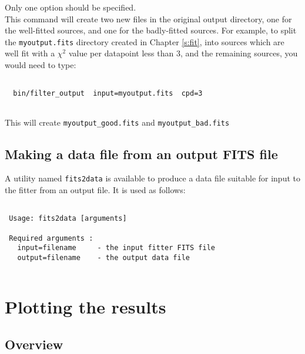 \documentclass[letterpaper,11pt]{report}
\begin{document}
Only one option should be specified.\\

This command will create two new files in the original output directory, one for the well-fitted sources, and one for the badly-fitted sources. For example, to split the \texttt{myoutput.fits} directory created in Chapter \ref{s:fit}, into sources which are well fit with a $\chi^2$ value per datapoint less than $3$, and the remaining sources, you would need to type:

\begin{Verbatim}[frame=single,label=Example]

  bin/filter_output  input=myoutput.fits  cpd=3
  
\end{Verbatim}

This will create \texttt{myoutput\_good.fits} and \texttt{myoutput\_bad.fits}

\section{Making a data file from an output FITS file}

A utility named \texttt{fits2data} is available to produce a data file suitable for input to the fitter from an output file. It is used as follows:

\begin{Verbatim}[frame=single,label=Syntax]

 Usage: fits2data [arguments]
 
 Required arguments :
   input=filename     - the input fitter FITS file
   output=filename    - the output data file
   
 \end{Verbatim}
 
\chapter{Plotting the results}

\label{ch:plotting}

\section{Overview}

\label{sec:plotoverview}
\end{document}
